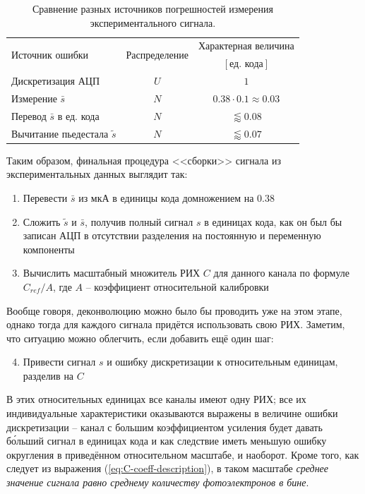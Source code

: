 \documentclass[12pt]{book}
\begin{document}
	\begin{table}
		\centering
		\begin{tabular}{ |l|c|c| }
			\toprule
			\multirow{2}{*}{Источник ошибки} & \multirow{2}{*}{Распределение}
			 & Характерная величина \\
			& & $[\text{ед. кода}]$ \\
			\midrule
			Дискретизация АЦП & $U$ & $1$ \\ 
			Измерение $\bar{s}$ & $N$ & $0.38 \cdot 0.1 \approx 0.03$ \\ 
			Перевод $\bar{s}$ в ед. кода & $N$ & $\lessapprox 0.08$ \\ 
			Вычитание пьедестала $\tilde{s}$ & $N$ & $\lessapprox 0.07$ \\ 
			\bottomrule
		\end{tabular}
		\caption{\label{tab:s-measurement-errors}Сравнение разных источников погрешностей измерения экспериментального сигнала.}
	\end{table}

	Таким образом, финальная процедура <<сборки>> сигнала из экспериментальных данных выглядит так:
	
	\begin{enumerate}
		\item Перевести $\bar{s}$ из мкА в единицы кода домножением на $0.38$
		\item Сложить $\tilde{s}$ и $\bar{s}$, получив полный сигнал $s$ в единицах кода, как он был бы записан АЦП в отсутствии разделения на постоянную и переменную компоненты
		\item Вычислить масштабный множитель РИХ $C$ для данного канала по формуле $C_{ref} / A$, где $A$ -- коэффициент относительной калибровки
	\end{enumerate}

	Вообще говоря, деконволюцию можно было бы проводить уже на этом этапе, однако тогда для каждого сигнала придётся использовать свою РИХ. Заметим, что ситуацию можно облегчить, если добавить ещё один шаг:
	
	\begin{enumerate}
		\setcounter{enumi}{3}
		\item Привести сигнал $s$ и ошибку дискретизации к относительным единицам, разделив на $C$
	\end{enumerate}

	В этих относительных единицах все каналы имеют одну РИХ; все их индивидуальные характеристики оказываются выражены в величине ошибки дискретизации -- канал с большим коэффициентом усиления будет давать б\'{о}льший сигнал в единицах кода и как следствие иметь меньшую ошибку округления в приведённом относительном масштабе, и наоборот. Кроме того, как следует из выражения (\ref{eq:C-coeff-description}), в таком масштабе \textit{среднее значение сигнала равно среднему количеству фотоэлектронов в бине}.
	
\end{document}
